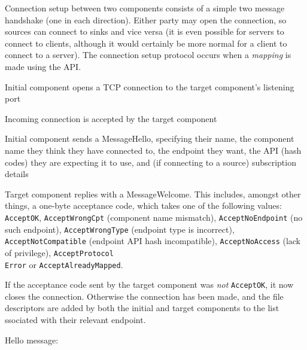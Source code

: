 \documentclass[12pt,a4paper,twoside]{article}
\renewcommand{\_}{\texttt{\symbol{95}}}
\begin{document}
Connection setup between two components consists of a simple two message
handshake (one in each direction). Either party may open the connection,
so sources can connect to sinks and vice versa (it is even possible
for servers to connect to clients, although it would certainly be
more normal for a client to connect to a server). The connection setup
protocol occurs when a \textit{mapping} is made using the API.

\begin{bulletlist}
\item Initial component opens a TCP connection to the target component's
	listening port
\item Incoming connection is accepted by the target component
\item Initial component sends a MessageHello, specifying their name,
	the component name they think they have connected to, the endpoint
	they want, the API (hash codes) they are expecting it to use,
	and (if connecting to a source) subscription details
\item Target component replies with a MessageWelcome. This includes,
	amongst other things,
	a one-byte acceptance code, which takes one of the following values:\\
	\verb^AcceptOK^, \verb^AcceptWrongCpt^ (component name mismatch),
	\verb^AcceptNoEndpoint^ (no such endpoint),
	\verb^AcceptWrongType^ (endpoint type is incorrect),
	\verb^AcceptNotCompatible^ (endpoint API hash incompatible),
	\verb^AcceptNoAccess^ (lack of privilege), \verb^AcceptProtocol^\\
	\verb^Error^ or \verb^AcceptAlreadyMapped^.
\item If the acceptance code sent by the target component was
	\textit{not} \verb^AcceptOK^,
	it now closes the connection. Otherwise the connection has been made,
	and the file
	descriptors are added by both the initial and target components to
	the list ssociated with their relevant endpoint.
\end{bulletlist}

Hello message:
\end{document}
